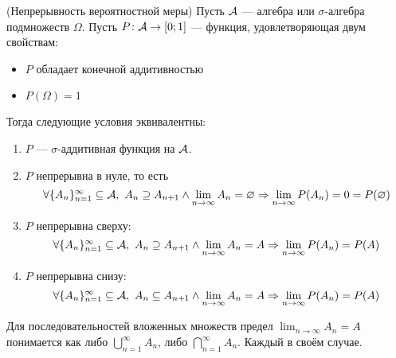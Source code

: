 \begin{theorem} (Непрерывность вероятностной меры)
	Пусть $\mathcal{A}$ --- алгебра или $\sigma$-алгебра подмножеств $\Omega$. Пусть $P \colon \mathcal{A} \to [0; 1]$ --- функция, удовлетворяющая двум свойствам:
	\begin{itemize}
		\item $P$ обладает конечной аддитивностью
		
		\item $P(\Omega) = 1$
	\end{itemize}
	Тогда следующие условия эквивалентны:
	\begin{enumerate}
		\item $P$ --- $\sigma$-аддитивная функция на $\mathcal{A}$.
		
		\item $P$ непрерывна в нуле, то есть
		\[
			\forall \{A_n\}_{n = 1}^\infty \subseteq \mathcal{A},\ A_n \supseteq A_{n + 1} \wedge \lim_{n \to \infty} A_n = \varnothing \Rightarrow \lim_{n \to \infty} P(A_n) = 0 = P(\varnothing)
		\]
		
		\item $P$ непрерывна сверху:
		\[
			\forall \{A_n\}_{n = 1}^\infty \subseteq \mathcal{A},\ A_n \supseteq A_{n + 1} \wedge \lim_{n \to \infty} A_n = A \Rightarrow \lim_{n \to \infty} P(A_n) = P(A)
		\]
		
		\item $P$ непрерывна снизу:
		\[
			\forall \{A_n\}_{n = 1}^\infty \subseteq \mathcal{A},\ A_n \subseteq A_{n + 1} \wedge \lim_{n \to \infty} A_n = A \Rightarrow \lim_{n \to \infty} P(A_n) = P(A)
		\]
	\end{enumerate}
\end{theorem}

\begin{note}
	Для последовательностей вложенных множеств предел $\lim_{n \to \infty} A_n = A$ понимается как либо $\bigcup_{n = 1}^\infty A_n$, либо $\bigcap_{n = 1}^\infty A_n$. Каждый в своём случае.
\end{note}

